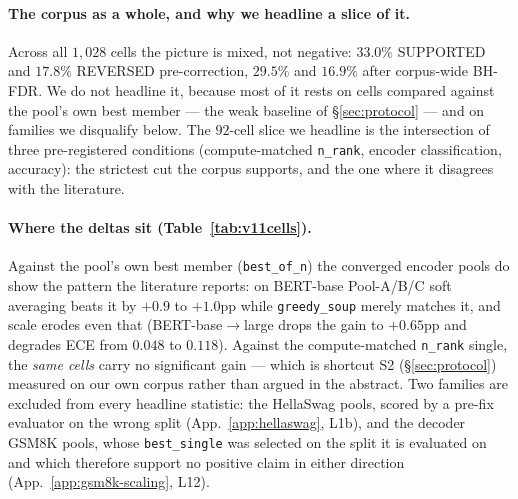 \documentclass[11pt]{article}
\begin{document}
\paragraph{The corpus as a whole, and why we headline a slice of it.} Across all $1{,}028$ cells the picture is mixed, not negative: $33.0\%$ SUPPORTED and $17.8\%$ REVERSED pre-correction, $29.5\%$ and $16.9\%$ after corpus-wide BH-FDR. We do not headline it, because most of it rests on cells compared against the pool's own best member --- the weak baseline of \S\ref{sec:protocol} --- and on families we disqualify below. The $92$-cell slice we headline is the intersection of three pre-registered conditions (compute-matched \texttt{n\_rank}, encoder classification, accuracy): the strictest cut the corpus supports, and the one where it disagrees with the literature.

\paragraph{Where the deltas sit (Table~\ref{tab:v11cells}).} Against the pool's own best member (\texttt{best\_of\_n}) the converged encoder pools do show the pattern the literature reports: on BERT-base Pool-A/B/C soft averaging beats it by $+0.9$ to $+1.0$pp while \texttt{greedy\_soup} merely matches it, and scale erodes even that (BERT-base$\to$large drops the gain to $+0.65$pp and degrades ECE from $0.048$ to $0.118$). Against the compute-matched \texttt{n\_rank} single, the \emph{same cells} carry no significant gain --- which is shortcut S2 (\S\ref{sec:protocol}) measured on our own corpus rather than argued in the abstract. Two families are excluded from every headline statistic: the HellaSwag pools, scored by a pre-fix evaluator on the wrong split (App.~\ref{app:hellaswag}, L1b), and the decoder GSM8K pools, whose \texttt{best\_single} was selected on the split it is evaluated on and which therefore support no positive claim in either direction (App.~\ref{app:gsm8k-scaling}, L12).
\end{document}
